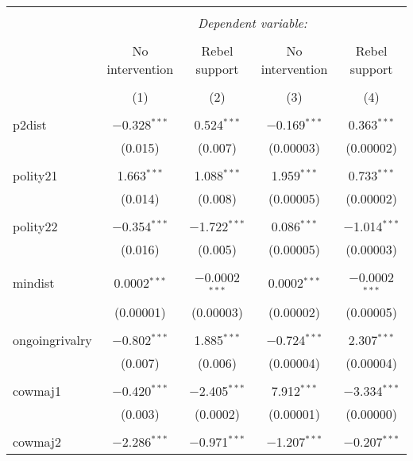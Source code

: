 
\begin{table}[!htbp] \centering 
  \caption{} 
  \label{} 
\begin{tabular}{@{\extracolsep{5pt}}lcccc} 
\\[-1.8ex]\hline 
\hline \\[-1.8ex] 
 & \multicolumn{4}{c}{\textit{Dependent variable:}} \\ 
\cline{2-5} 
\\[-1.8ex] & No intervention & Rebel support & No intervention & Rebel support \\ 
\\[-1.8ex] & (1) & (2) & (3) & (4)\\ 
\hline \\[-1.8ex] 
 p2dist & $-$0.328$^{***}$ & 0.524$^{***}$ & $-$0.169$^{***}$ & 0.363$^{***}$ \\ 
  & (0.015) & (0.007) & (0.00003) & (0.00002) \\ 
  & & & & \\ 
 polity21 & 1.663$^{***}$ & 1.088$^{***}$ & 1.959$^{***}$ & 0.733$^{***}$ \\ 
  & (0.014) & (0.008) & (0.00005) & (0.00002) \\ 
  & & & & \\ 
 polity22 & $-$0.354$^{***}$ & $-$1.722$^{***}$ & 0.086$^{***}$ & $-$1.014$^{***}$ \\ 
  & (0.016) & (0.005) & (0.00005) & (0.00003) \\ 
  & & & & \\ 
 mindist & 0.0002$^{***}$ & $-$0.0002$^{***}$ & 0.0002$^{***}$ & $-$0.0002$^{***}$ \\ 
  & (0.00001) & (0.00003) & (0.00002) & (0.00005) \\ 
  & & & & \\ 
 ongoingrivalry & $-$0.802$^{***}$ & 1.885$^{***}$ & $-$0.724$^{***}$ & 2.307$^{***}$ \\ 
  & (0.007) & (0.006) & (0.00004) & (0.00004) \\ 
  & & & & \\ 
 cowmaj1 & $-$0.420$^{***}$ & $-$2.405$^{***}$ & 7.912$^{***}$ & $-$3.334$^{***}$ \\ 
  & (0.003) & (0.0002) & (0.00001) & (0.00000) \\ 
  & & & & \\ 
 cowmaj2 & $-$2.286$^{***}$ & $-$0.971$^{***}$ & $-$1.207$^{***}$ & $-$0.207$^{***}$ \\ 

\end{tabular}
\end{table}
